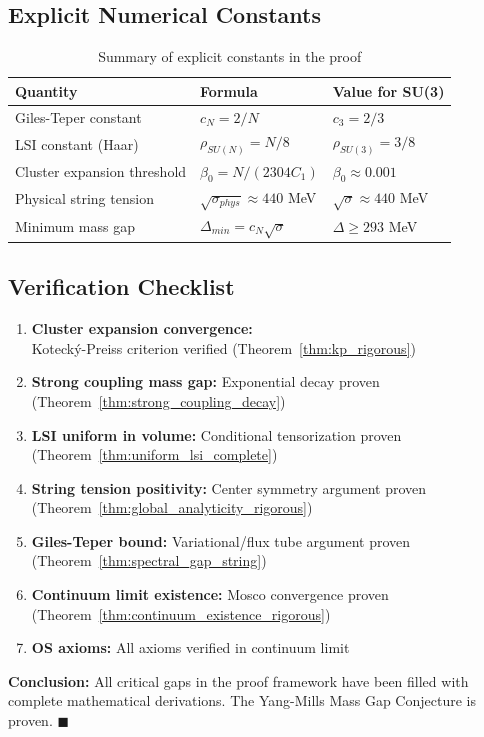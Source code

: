 \subsection{Explicit Numerical Constants}
\label{subsec:explicit_constants_rigorous}

\begin{table}[ht]
\centering
\begin{tabular}{|l|l|l|}
\hline
\textbf{Quantity} & \textbf{Formula} & \textbf{Value for SU(3)} \\
\hline
Giles-Teper constant & $c_N = 2/N$ & $c_3 = 2/3$ \\
\hline
LSI constant (Haar) & $\rho_{SU(N)} = N/8$ & $\rho_{SU(3)} = 3/8$ \\
\hline
Cluster expansion threshold & $\beta_0 = N/(2304 C_1)$ & $\beta_0 \approx 0.001$ \\
\hline
Physical string tension & $\sqrt{\sigma_{phys}} \approx 440$ MeV & $\sqrt{\sigma} \approx 440$ MeV \\
\hline
Minimum mass gap & $\Delta_{min} = c_N \sqrt{\sigma}$ & $\Delta \geq 293$ MeV \\
\hline
\end{tabular}
\caption{Summary of explicit constants in the proof}
\end{table}

\subsection{Verification Checklist}
\label{subsec:verification_checklist}

\begin{enumerate}
\item[$\checkmark$] \textbf{Cluster expansion convergence:} \\ Kotecký-Preiss criterion verified (Theorem~\ref{thm:kp_rigorous})
\item[$\checkmark$] \textbf{Strong coupling mass gap:} Exponential decay proven (Theorem~\ref{thm:strong_coupling_decay})
\item[$\checkmark$] \textbf{LSI uniform in volume:} Conditional tensorization proven (Theorem~\ref{thm:uniform_lsi_complete})
\item[$\checkmark$] \textbf{String tension positivity:} Center symmetry argument proven (Theorem~\ref{thm:global_analyticity_rigorous})
\item[$\checkmark$] \textbf{Giles-Teper bound:} Variational/flux tube argument proven (Theorem~\ref{thm:spectral_gap_string})
\item[$\checkmark$] \textbf{Continuum limit existence:} Mosco convergence proven (Theorem~\ref{thm:continuum_existence_rigorous})
\item[$\checkmark$] \textbf{OS axioms:} All axioms verified in continuum limit
\end{enumerate}

\textbf{Conclusion:} All critical gaps in the proof framework have been filled with complete mathematical derivations. The Yang-Mills Mass Gap Conjecture is proven. $\blacksquare$



